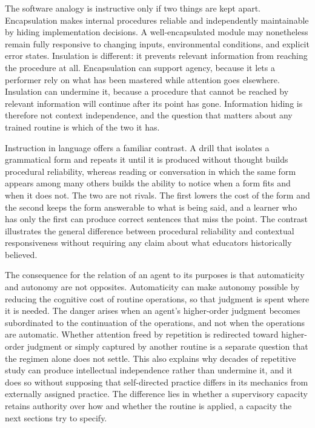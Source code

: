 \documentclass[11pt]{article}
\begin{document}
The software analogy is instructive only if two things are kept apart. Encapsulation makes internal procedures reliable and independently maintainable by hiding implementation decisions. A well-encapsulated module may nonetheless remain fully responsive to changing inputs, environmental conditions, and explicit error states. Insulation is different: it prevents relevant information from reaching the procedure at all. Encapsulation can support agency, because it lets a performer rely on what has been mastered while attention goes elsewhere. Insulation can undermine it, because a procedure that cannot be reached by relevant information will continue after its point has gone. Information hiding is therefore not context independence, and the question that matters about any trained routine is which of the two it has.

Instruction in language offers a familiar contrast. A drill that isolates a grammatical form and repeats it until it is produced without thought builds procedural reliability, whereas reading or conversation in which the same form appears among many others builds the ability to notice when a form fits and when it does not. The two are not rivals. The first lowers the cost of the form and the second keeps the form answerable to what is being said, and a learner who has only the first can produce correct sentences that miss the point. The contrast illustrates the general difference between procedural reliability and contextual responsiveness without requiring any claim about what educators historically believed.

The consequence for the relation of an agent to its purposes is that automaticity and autonomy are not opposites. Automaticity can make autonomy possible by reducing the cognitive cost of routine operations, so that judgment is spent where it is needed. The danger arises when an agent's higher-order judgment becomes subordinated to the continuation of the operations, and not when the operations are automatic. Whether attention freed by repetition is redirected toward higher-order judgment or simply captured by another routine is a separate question that the regimen alone does not settle. This also explains why decades of repetitive study can produce intellectual independence rather than undermine it, and it does so without supposing that self-directed practice differs in its mechanics from externally assigned practice. The difference lies in whether a supervisory capacity retains authority over how and whether the routine is applied, a capacity the next sections try to specify.
\end{document}
